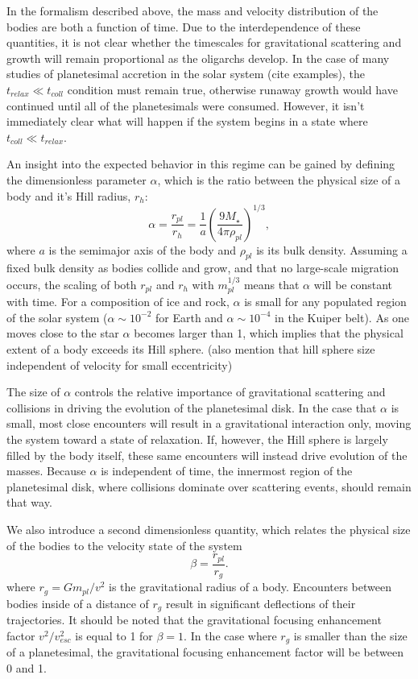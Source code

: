 \documentclass[twocolumn]{aastex63}
\begin{document}
In the formalism described above, the mass and velocity distribution of the bodies are both a function of time. Due to the interdependence of these quantities, it is not clear whether the timescales for gravitational scattering and growth will remain proportional as the oligarchs develop. In the case of many studies of planetesimal accretion in the solar system (cite examples), the $t_{relax} \ll t_{coll}$ condition must remain true, otherwise runaway growth would have continued until all of the planetesimals were consumed. However, it isn't immediately clear what will happen if the system begins in a state where $t_{coll} \ll t_{relax}$.

An insight into the expected behavior in this regime can be gained by
defining the dimensionless parameter $\alpha$, which is the ratio
between the physical size of a body and it's Hill radius, $r_{h}$:
\begin{equation}\label{eq:alpha}
	\alpha = \frac{r_{pl}}{r_{h}} = \frac{1}{a} \left( \frac{9 M_{\star}}{4 \pi \rho_{pl}} \right)^{1/3},
\end{equation}
where $a$ is the semimajor axis of the body and $\rho_{pl}$ is its bulk density. Assuming a fixed bulk density as bodies collide and grow, and that no large-scale migration occurs, the scaling of both $r_{pl}$ and $r_{h}$ with $m_{pl}^{1/3}$ means that $\alpha$ will be constant with time. For a composition of ice and rock, $\alpha$ is small for any populated region of the solar system ($\alpha \sim 10^{-2}$ for Earth and $\alpha \sim 10^{-4}$ in the Kuiper belt). As one moves close to the star $\alpha$ becomes larger than 1, which implies that the physical extent of a body exceeds its Hill sphere. (also mention that hill sphere size independent of velocity for small eccentricity)

The size of $\alpha$ controls the relative importance of gravitational scattering and collisions in driving the evolution of the planetesimal disk. In the case that $\alpha$ is small, most close encounters will result in a gravitational interaction only, moving the system toward a state of relaxation. If, however, the Hill sphere is largely filled by the body itself, these same encounters will instead drive evolution of the masses. Because $\alpha$ is independent of time, the innermost region of the planetesimal disk, where collisions dominate over scattering events, should remain that way.

We also introduce a second dimensionless quantity, which relates the physical size of the bodies to the velocity state of the system
\begin{equation}\label{eq:beta}
	\beta = \frac{r_{pl}}{r_{g}}.
\end{equation}
where $r_{g} = G m_{pl} / v^{2}$ is the gravitational radius of a body. Encounters between bodies inside of a distance of $r_{g}$ result in significant deflections of their trajectories. It should be noted that the gravitational focusing enhancement factor $v^{2}/v_{esc}^{2}$ is equal to 1 for $\beta = 1$. In the case where $r_{g}$ is smaller than the size of a planetesimal, the gravitational focusing enhancement factor will be between 0 and 1.
\end{document}
